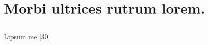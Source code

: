 


\chapter[Morbi ultrices rutrum lorem]{Morbi ultrices rutrum lorem. \showfont}

\showfont
\section[Some encoding tests]{\showfont}
\subsection{\showfont}
\subsubsection{\showfont}
\subsubsubsection{\showfont}



Lipsum me [30]

